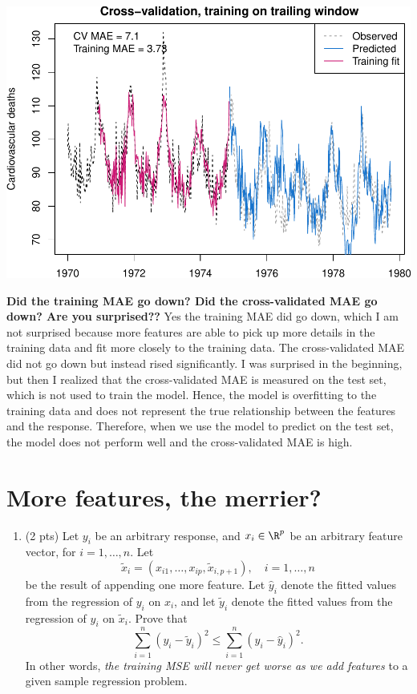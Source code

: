 \documentclass[
]{article}
\providecommand{\tightlist}{%
  \setlength{\itemsep}{0pt}\setlength{\parskip}{0pt}}
\begin{document}
\includegraphics{homework2_files/figure-latex/unnamed-chunk-4-1.pdf}

\textbf{Did the training MAE go down? Did the cross-validated MAE go
down? Are you surprised??} Yes the training MAE did go down, which I am
not surprised because more features are able to pick up more details in
the training data and fit more closely to the training data. The
cross-validated MAE did not go down but instead rised significantly. I
was surprised in the beginning, but then I realized that the
cross-validated MAE is measured on the test set, which is not used to
train the model. Hence, the model is overfitting to the training data
and does not represent the true relationship between the features and
the response. Therefore, when we use the model to predict on the test
set, the model does not perform well and the cross-validated MAE is
high.

\hypertarget{more-features-the-merrier}{%
\section{More features, the merrier?}\label{more-features-the-merrier}}

\begin{enumerate}
\def\labelenumi{\arabic{enumi}.}
\setcounter{enumi}{14}
\tightlist
\item
  (2 pts) Let \(y_i\) be an arbitrary response, and \(x_i \in \R^p\) be
  an arbitrary feature vector, for \(i = 1,\dots,n\). Let \[
  \tilde{x}_i = (x_{i1}, \dots, x_{ip}, \tilde{x}_{i,p+1}),\quad i = 1,\dots,n
  \] be the result of appending one more feature. Let \(\hat{y}_i\)
  denote the fitted values from the regression of \(y_i\) on \(x_i\),
  and let \(\tilde{y}_i\) denote the fitted values from the regression
  of \(y_i\) on \(\tilde{x}_i\). Prove that \[
  \sum_{i=1}^n (y_i - \tilde{y}_i)^2 \leq \sum_{i=1}^n (y_i - \hat{y}_i)^2.
  \] In other words, \emph{the training MSE will never get worse as we
  add features} to a given sample regression problem.
\end{enumerate}
\end{document}
